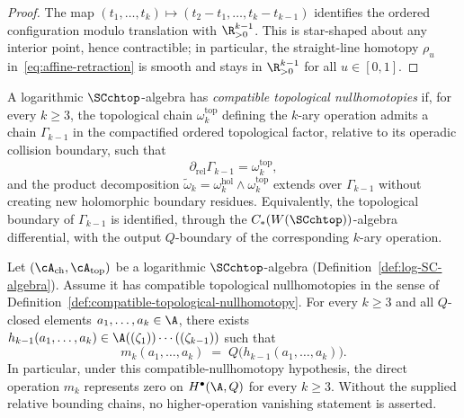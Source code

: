 \begin{proof}
The map $(t_1,\ldots,t_k)\mapsto (t_2-t_1,\ldots,t_k-t_{k-1})$ identifies the ordered
configuration modulo translation with $\R^{k-1}_{>0}$. This is star-shaped about any interior
point, hence contractible; in particular, the straight-line homotopy
$\rho_u$ in~\eqref{eq:affine-retraction} is smooth and stays in
$\R^{k-1}_{>0}$ for all $u\in[0,1]$.
\end{proof}

\begin{definition}
\label{def:compatible-topological-nullhomotopy}
A logarithmic $\SCchtop$-algebra has \emph{compatible topological
nullhomotopies} if, for every $k\ge3$, the topological chain
$\omega_k^{\mathrm{top}}$ defining the $k$-ary operation admits a
chain $\Gamma_{k-1}$ in the compactified ordered topological factor,
relative to its operadic collision boundary, such that
\[
\partial_{\mathrm{rel}}\Gamma_{k-1}=\omega_k^{\mathrm{top}},
\]
and the product decomposition
$\widetilde\omega_k=\omega_k^{\mathrm{hol}}\wedge\omega_k^{\mathrm{top}}$
extends over $\Gamma_{k-1}$ without creating new holomorphic
boundary residues. Equivalently, the topological boundary of
$\Gamma_{k-1}$ is identified, through the
$C_\ast(W(\SCchtop))$-algebra differential, with the output
$Q$-boundary of the corresponding $k$-ary operation.
\end{definition}

\begin{proposition}[Higher operations are \(Q\)-exact under compatible topological
nullhomotopies; \ClaimStatusProvedHere; licensing $\gamma+\varepsilon$
via the logarithmic chain/pro ambient $\hypAmbientPro$, the
relative compactified ordered topological factor, compatible
topological nullhomotopies in
Definition~\textup{\ref{def:compatible-topological-nullhomotopy}}, and
the factorisation
\(\widetilde\omega_k=\omega_k^{\mathrm{hol}}\wedge\omega_k^{\mathrm{top}}\)]
\label{prop:m3_vanish}
Let $(\cA_{\mathrm{ch}}, \cA_{\mathrm{top}})$ be a logarithmic $\SCchtop$-algebra (Definition~\ref{def:log-SC-algebra}).
Assume it has compatible topological nullhomotopies in the sense of
Definition~\ref{def:compatible-topological-nullhomotopy}.
For every $k\ge3$ and all $Q$-closed elements $a_1,\ldots,a_k\in\A$,
there exists $h_{k-1}(a_1,\ldots,a_k)\in\A((\zeta_1))\cdots((\zeta_{k-1}))$ such that
\begin{equation}
\label{eq:higher-Q-exact}
m_k(a_1,\ldots,a_k)
\;=\;
Q\bigl(h_{k-1}(a_1,\ldots,a_k)\bigr).
\end{equation}
In particular, under this compatible-nullhomotopy hypothesis, the
direct operation \(m_k\) represents zero on \(H^\bullet(\A,Q)\) for
every \(k\ge3\).  Without the supplied relative bounding chains, no
higher-operation vanishing statement is asserted.
\end{proposition}

